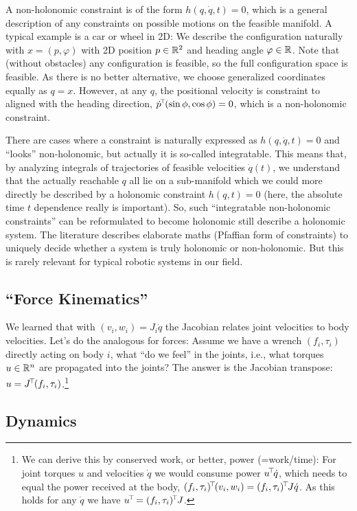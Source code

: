 A non-holonomic constraint is of the form $h(q,\dot q,t)=0$, which is
a general description of any constraints on
possible motions on the feasible manifold. A typical example is a car
or wheel in 2D: We describe the configuration naturally with $x =
(p,\varphi)$ with 2D position $p\in{\mathbb{R}}^2$ and heading angle
$\varphi\in{\mathbb{R}}$. Note that (without obstacles) any configuration is
feasible, so the full configuration space is feasible. As there is no
better alternative, we choose generalized coordinates equally as $q =
x$. However, at any $q$, the positional velocity is constraint to
aligned with the heading direction, $\dot p^{\!\top\!} (\sin\phi, \cos\phi) = 0$,
which is a non-holonomic constraint.

There are cases where a constraint is naturally expressed as $h(q,\dot
q,t)=0$ and ``looks'' non-holonomic, but actually it is so-called
integratable. This means that, by analyzing integrals of trajectories of
feasible velocities $\dot q(t)$, we understand that the actually
reachable $q$ all lie on a sub-manifold which we could more directly
be described by a holonomic constraint $h(q, t)=0$ (here, the absolute time
$t$ dependence really is important). So, such ``integratable
non-holonomic constraints'' can be reformulated to become holonomic
still describe a holonomic system. The literature describes elaborate
maths (Pfaffian form of constraints) to uniquely decide whether a system is truly
holonomic or non-holonomic. But this is rarely relevant for typical
robotic systems in our field.

\subsection{``Force Kinematics''}

We learned that with 
$(v_i,w_i) = J_i \dot q$ the Jacobian relates joint velocities to body
velocities. Let's do the analogous for forces: Assume we have a wrench
$(f_i,\tau_i)$ directly acting on body $i$, what ``do we feel'' in the
joints, i.e., what torques $u\in{\mathbb{R}}^n$ are propagated into the
joints? The answer is the Jacobian transpose: $u = J^{\!\top\!}
(f_i,\tau_i)$.\footnote{We can derive this by conserved work, or better,
power (=work/time): For joint torques $u$ and velocities $\dot q$ we
would consume power $u^{\!\top\!} \dot q$, which needs to equal the power
received at the body, $(f_i,\tau_i)^{\!\top\!} (v_i,w_i) = (f_i,\tau_i)^{\!\top\!} J
\dot q$. As this holds for any $\dot q$ we have $u^{\!\top\!} = (f_i,\tau_i)^{\!\top\!} J$.}


\subsection{Dynamics}

